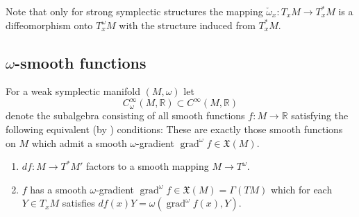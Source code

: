 \documentclass[12pt]{amsart}
\newcommand{\rev}[1]{#1}
\theoremstyle{definition}
\def\om{\omega}
\def\Ga{\Gamma}
\def\X{{\mathfrak X}}
\let\on=\operatorname
\begin{document}
Note that only for strong symplectic structures the mapping 
$\check\om_x:T_xM\to T_x^*M$ is a diffeomorphism onto 
$T_x^\om M$ with the structure induced from $T_x^*M$. 


\subsection{$\om$-smooth functions} \label{app:om-smooth}
For a weak symplectic manifold  
$(M,\om)$
let 
$$
C^\infty_\om (M,\mathbb R) \subset C^\infty(M,\mathbb R)
$$
denote the subalgebra consisting of all smooth functions  $f:M \to  \mathbb R$ satisfying the following equivalent (by \cite[Lemma 48.6]{kriegl_michor_1997convenient}) conditions:
These are exactly those smooth functions on $M$ which admit a smooth 
$\om$-gradient $\on{grad}^\om f\in \X(M)$. 
\begin{enumerate}
\rev{
\item $df:M \to   T^*M'$ factors to a
        smooth mapping $M\to  T^\om$. 
\item $f$ has a smooth $\om$-gradient 
        $\on{grad}^\om f\in \X(M) = \Ga(TM)$ which for each $Y\in T_xM$ 
        satisfies  
        $df(x)Y = \om(\on{grad}^\om f(x),Y)$.
}\end{enumerate}
\end{document}
